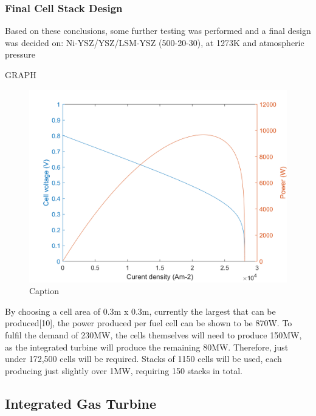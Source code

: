     \subsubsection{Final Cell Stack Design}
    Based on these conclusions, some further testing was performed and a final design was decided on:
Ni-YSZ/YSZ/LSM-YSZ (500-20-30), at 1273K and atmospheric pressure

GRAPH
\begin{figure}[h!]
    \centering
    \includegraphics[scale = 0.25]{power_voltage_against_current.png}
    \caption{Caption}
    \label{fig:SOFCfinal}
\end{figure}

By choosing a cell area of 0.3m x 0.3m, currently the largest that can be produced[10], the power produced per fuel cell can be shown to be 870W. To fulfil the demand of 230MW, the cells themselves will need to produce 150MW, as the integrated turbine will produce the remaining 80MW. Therefore, just under 172,500 cells will be required. Stacks of 1150 cells will be used, each producing just slightly over 1MW, requiring 150 stacks in total.
        
\subsection{Integrated Gas Turbine}
